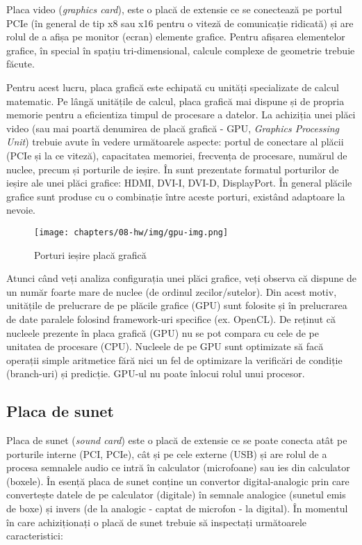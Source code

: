 Placa video (\textit{graphics card}), este o placă de extensie ce se conectează pe portul PCIe (în general
de tip x8 sau x16 pentru o viteză de comunicație ridicată) și are rolul de a
afișa pe monitor (ecran) elemente grafice. Pentru afișarea elementelor grafice,
în special în spațiu tri-dimensional, calcule complexe de geometrie trebuie
făcute.

Pentru acest lucru, placa grafică este echipată cu unități specializate
de calcul matematic. Pe lângă unitățile de calcul, placa grafică mai dispune și
de propria memorie pentru a eficientiza timpul de procesare a datelor. La
achiziția unei plăci video (sau mai poartă denumirea de placă grafică - GPU, \textit{Graphics Processing Unit}) trebuie avute în vedere următoarele
aspecte: portul de conectare al plăcii (PCIe și la ce viteză), capacitatea
memoriei, frecvența de procesare, numărul de nuclee, precum și porturile de
ieșire. În  sunt prezentate formatul
porturilor de ieșire ale unei plăci grafice: HDMI, DVI-I, DVI-D, DisplayPort. În
general plăcile grafice sunt produse cu o combinație între aceste porturi,
existând adaptoare la nevoie.

\begin{figure}[!htbp]
  \centering
  \texttt{[image: chapters/08-hw/img/gpu-img.png]}
  \caption{Porturi ieșire placă grafică\protect\footnotemark}
  \label{fig:hw:gpu}
\end{figure}

Atunci când veți analiza configurația unei plăci grafice, veți observa că
dispune de un număr foarte mare de nuclee (de ordinul zecilor/sutelor). Din
acest motiv, unitățile de prelucrare de pe plăcile grafice (GPU) sunt folosite și în prelucrarea de date
paralele folosind framework-uri specifice (ex. OpenCL). De reținut că nucleele
prezente în placa grafică (GPU) nu se pot compara cu cele de pe unitatea de
procesare (CPU). Nucleele de pe GPU sunt optimizate să facă operații simple
aritmetice fără nici un fel de optimizare la verificări de condiție (branch-uri)
și predicție. GPU-ul nu poate înlocui rolul unui procesor.

\subsection{Placa de sunet}
\label{sec:hw:extension:sound}

Placa de sunet (\textit{sound card}) este o placă de extensie ce se poate conecta atât pe porturile
interne (PCI, PCIe), cât și pe cele externe (USB) și are rolul de a procesa
semnalele audio ce intră în calculator (microfoane) sau ies din calculator
(boxele). În esență placa de sunet conține un convertor digital-analogic prin
care convertește datele de pe calculator (digitale) în semnale analogice
(sunetul emis de boxe) și invers (de la analogic - captat de microfon - la
digital). În momentul în care achiziționați o placă de sunet trebuie să
inspectați următoarele caracteristici:


